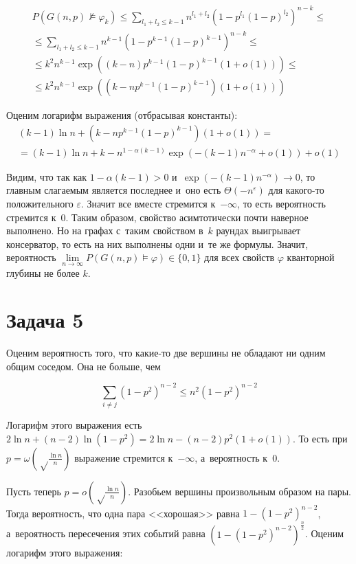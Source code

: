 \documentclass{article}
\theoremstyle{definition}
\theoremstyle{remark}
\renewcommand{\le}{\leqslant}
\newcommand{\eps}{\varepsilon}
\renewcommand{\phi}{\varphi}
\begin{document}
\begin{multline*}
	P(G(n, p) \not\models \phi_k) \le \sum\limits_{l_1 + l_2 \le k - 1} n^{l_1 + l_2} (1 - p^{l_1} (1 -
	p)^{l_2})^{n-k} \le \\
	\le \sum\limits_{l_1 + l_2 \le k - 1} n^{k-1} (1 - p^{k-1} (1 - p)^{k-1})^{n-k} \le \\
	\le k^2 n^{k-1} \exp\left( (k - n) p^{k-1} (1 - p)^{k-1} (1 + o(1))\right) \le \\
	\le k^2 n^{k-1} \exp\left( (k - n p^{k-1} (1-p)^{k-1} ) (1 + o(1)) \right)
\end{multline*}

Оценим логарифм выражения (отбрасывая константы):
\begin{multline*}
	(k - 1) \ln n + (k - n p^{k-1} (1 - p)^{k-1})(1 + o(1)) =\\
	= (k - 1)\ln n + k - n^{1 - \alpha (k-1)} \exp(-(k-1)n^{-\alpha} + o(1)) + o(1)
\end{multline*}

Видим, что так как $1 - \alpha (k - 1) > 0$ и~$\exp(-(k-1)n^{-\alpha}) \rightarrow 0$, то главным
слагаемым является последнее и~оно есть $\Theta(-n^\eps)$ для какого-то положительного $\eps$.
Значит все вместе стремится к~$-\infty$, то есть вероятность стремится к~0. Таким образом, свойство
асимтотически почти наверное выполнено. Но на графах с~таким свойством в~$k$ раундах выигрывает
консерватор, то есть на них выполнены одни и~те же формулы. Значит, вероятность $\lim\limits_{n
\rightarrow \infty}P(G(n, p) \models \phi) \in \{0, 1\}$ для всех свойств $\phi$ кванторной
глубины не более $k$.

\section*{Задача 5}

Оценим вероятность того, что какие-то две вершины не обладают ни одним общим соседом. Она не больше,
чем

$$ \sum\limits_{i \ne j} (1 - p^2)^{n-2} \le n^2 (1 - p^2)^{n-2} $$

Логарифм этого выражения есть $2 \ln n + (n - 2) \ln (1 - p^2) = 2\ln n - (n - 2) p^2 (1 + o(1))$.
То есть при $p = \omega\left(\sqrt\frac{\ln n}{n}\right)$ выражение стремится к~$-\infty$,
а~вероятность к~0.

Пусть теперь $p = o\left(\sqrt\frac{\ln n}{n}\right)$. Разобьем вершины произвольным образом на
пары. Тогда вероятность, что одна пара <<хорошая>> равна $1 - (1 - p^2)^{n-2}$, а~вероятность
пересечения этих событий равна $(1 - (1 - p^2)^{n-2})^{\frac{n}{2}}$. Оценим логарифм
этого выражения:
\end{document}
